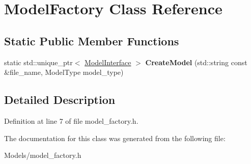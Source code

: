 \hypertarget{classModelFactory}{}\section{Model\+Factory Class Reference}
\label{classModelFactory}
\subsection*{Static Public Member Functions}
\begin{DoxyCompactItemize}
\item 
\mbox{\label{classModelFactory_aedb972860999dae2693b1f6a1c8fe920}} 
static std\+::unique\+\_\+ptr$<$ \hyperlink{classModelInterface}{Model\+Interface} $>$ {\bfseries Create\+Model} (std\+::string const \&file\+\_\+name, Model\+Type model\+\_\+type)
\end{DoxyCompactItemize}


\subsection{Detailed Description}


Definition at line 7 of file model\+\_\+factory.\+h.



The documentation for this class was generated from the following file\+:\begin{DoxyCompactItemize}
\item 
Models/model\+\_\+factory.\+h\end{DoxyCompactItemize}
